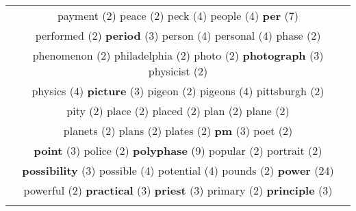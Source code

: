 \documentclass[12pt,a4paper]{article}
\begin{document}
\begin{center}
\begin{longtable}{|c|}
{\footnotesize \textcolor{Verde} {payment}} \footnotesize{(2)} {\footnotesize \textcolor{Verde} {peace}} \footnotesize{(2)} {\normalsize \textcolor{VerdeLocao} {peck}} \footnotesize{(4)} {\normalsize \textcolor{VerdeLocao} {people}} \footnotesize{(4)} {\LARGE \textcolor{Rosa} {\bf per}} \footnotesize{(7)}  \\ {\footnotesize \textcolor{Verde} {performed}} \footnotesize{(2)} {\small \textcolor{Laranja} {\bf period}} \footnotesize{(3)} {\normalsize \textcolor{VerdeLocao} {person}} \footnotesize{(4)} {\normalsize \textcolor{VerdeLocao} {personal}} \footnotesize{(4)} {\footnotesize \textcolor{Verde} {phase}} \footnotesize{(2)}  \\ {\footnotesize \textcolor{Verde} {phenomenon}} \footnotesize{(2)} {\footnotesize \textcolor{Verde} {philadelphia}} \footnotesize{(2)} {\footnotesize \textcolor{Verde} {photo}} \footnotesize{(2)} {\small \textcolor{Laranja} {\bf photograph}} \footnotesize{(3)} {\footnotesize \textcolor{Verde} {physicist}} \footnotesize{(2)}  \\ {\normalsize \textcolor{VerdeLocao} {physics}} \footnotesize{(4)} {\small \textcolor{Laranja} {\bf picture}} \footnotesize{(3)} {\footnotesize \textcolor{Verde} {pigeon}} \footnotesize{(2)} {\normalsize \textcolor{VerdeLocao} {pigeons}} \footnotesize{(4)} {\footnotesize \textcolor{Verde} {pittsburgh}} \footnotesize{(2)}  \\ {\footnotesize \textcolor{Verde} {pity}} \footnotesize{(2)} {\footnotesize \textcolor{Verde} {place}} \footnotesize{(2)} {\footnotesize \textcolor{Verde} {placed}} \footnotesize{(2)} {\footnotesize \textcolor{Verde} {plan}} \footnotesize{(2)} {\footnotesize \textcolor{Verde} {plane}} \footnotesize{(2)}  \\ {\footnotesize \textcolor{Verde} {planets}} \footnotesize{(2)} {\footnotesize \textcolor{Verde} {plans}} \footnotesize{(2)} {\footnotesize \textcolor{Verde} {plates}} \footnotesize{(2)} {\small \textcolor{Laranja} {\bf pm}} \footnotesize{(3)} {\footnotesize \textcolor{Verde} {poet}} \footnotesize{(2)}  \\ {\small \textcolor{Laranja} {\bf point}} \footnotesize{(3)} {\footnotesize \textcolor{Verde} {police}} \footnotesize{(2)} {\Huge \textcolor{AzulEscuro} {\bf polyphase}} \footnotesize{(9)} {\footnotesize \textcolor{Verde} {popular}} \footnotesize{(2)} {\footnotesize \textcolor{Verde} {portrait}} \footnotesize{(2)}  \\ {\small \textcolor{Laranja} {\bf possibility}} \footnotesize{(3)} {\normalsize \textcolor{VerdeLocao} {possible}} \footnotesize{(4)} {\normalsize \textcolor{VerdeLocao} {potential}} \footnotesize{(4)} {\footnotesize \textcolor{Verde} {pounds}} \footnotesize{(2)} {\Huge \textcolor{AzulEscuro} {\bf power}} \footnotesize{(24)}  \\ {\footnotesize \textcolor{Verde} {powerful}} \footnotesize{(2)} {\small \textcolor{Laranja} {\bf practical}} \footnotesize{(3)} {\small \textcolor{Laranja} {\bf priest}} \footnotesize{(3)} {\footnotesize \textcolor{Verde} {primary}} \footnotesize{(2)} {\small \textcolor{Laranja} {\bf principle}} \footnotesize{(3)}  \\ {\small 
\end{longtable}
\end{center}
\end{document}
